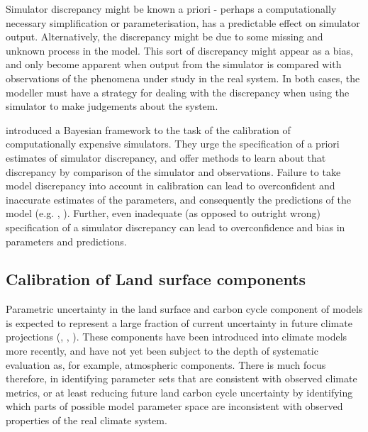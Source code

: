 \documentclass[esd, article]{copernicus} %
\begin{document}
Simulator discrepancy might be known a priori - perhaps a computationally necessary simplification or parameterisation, has a predictable effect on simulator output. Alternatively, the discrepancy might be due to some missing and unknown process in the model. This sort of discrepancy might appear as a bias, and only become apparent when output from the simulator is compared with observations of the phenomena under study in the real system. In both cases, the modeller must have a strategy for dealing with the discrepancy when using the simulator to make judgements about the system.

\cite{kennedy2001bayesian} introduced a Bayesian framework to the task of the calibration of computationally expensive simulators. They urge the specification of a priori estimates of simulator discrepancy, and offer methods to learn about that discrepancy by comparison of the simulator and observations. Failure to take model discrepancy into account in calibration can lead to overconfident and inaccurate estimates of the parameters, and consequently the predictions of the model (e.g. \cite{brynjarsdottir2014learning}, \cite{higdon2008calibration}). Further, even inadequate (as opposed to outright wrong) specification of a simulator discrepancy can lead to overconfidence and bias in parameters and predictions.

\subsection{Calibration of Land surface components}

Parametric uncertainty in the land surface and carbon cycle component of models is expected to represent a large fraction of current uncertainty in future climate projections (\cite{booth2012highsensitivity}, \cite{booth2013scenario}, \cite{huntingford2009contributions}). These components have been introduced into climate models more recently, and have not yet been subject to the depth of systematic evaluation as, for example, atmospheric components. There is much focus therefore, in identifying parameter sets that are consistent with observed climate metrics, or at least reducing future land carbon cycle uncertainty by identifying which parts of possible model parameter space are inconsistent with observed properties of the real climate system.  
\end{document}
